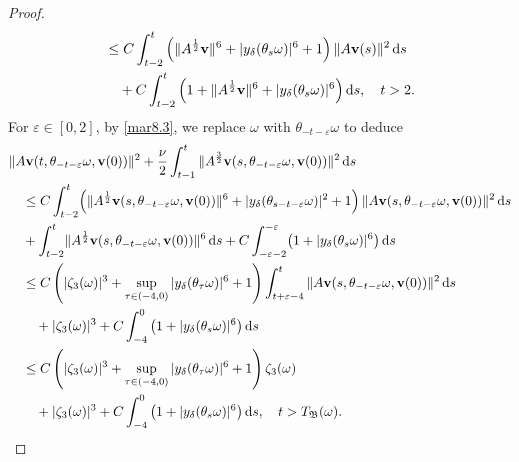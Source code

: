 \documentclass{elsarticle}
\theoremstyle{definition}
\numberwithin{equation}{section}
\renewcommand{\d}{{\rm{d}}}
\begin{document}
\begin{proof}
\begin{align*}
& \leq   C \int^t_{t-2} \left (\|A^{\frac{1}{2}}\textbf{v}\|^6+|y_\delta(\theta_s\omega)|^6+1\right)  \|A\textbf{v}(s) \|^2 \, \d s \\
&\quad + C\int^t_{t-2} \left (1+\|A^{\frac{1}{2}}\textbf{v}\|^6 +|y_\delta(\theta_s\omega)|^6 \right)  \d s ,\quad t> 2.
\end{align*}
For $\varepsilon\in  [0,2]$, by \eqref{mar8.3}, we replace $\omega$ with $\theta_{-t-\varepsilon} \omega$  to deduce
\begin{align*}
 & \|A\textbf{v} (t,\theta_{-t-\varepsilon} \omega, \textbf{v}(0)) \|^2 + \frac{ \nu}{2} \int_{t-1}^t  \|A^\frac32\textbf{v} (s,\theta_{-t-\varepsilon} \omega, \textbf{v}(0)) \|^2 \, \d s \nonumber \\
& \quad \leq   C \int^t_{t-2} \! \left (\|A^{\frac12}\textbf{v}(s,\theta_{-t-\varepsilon} \omega, \textbf{v}(0)) \|^6+|y_\delta(\theta_{s-t-\varepsilon} \omega)|^2+1\right)  \|A\textbf{v}(s,\theta_{-t-\varepsilon} \omega, \textbf{v}(0)) \|^2 \, \d s \nonumber\\
&\quad+\int^t_{t-2} \! \|A^{\frac12}\textbf{v}(s,\theta_{-t-\varepsilon} \omega, \textbf{v}(0)) \|^6\, \d s+ C\int^{-\varepsilon}_{-\varepsilon-2} \! \left(1 +|y_\delta(\theta_s\omega)|^6 \right )  \d s\nonumber\\
& \quad \leq   C\left (  |\zeta_3(\omega)|^3+ \sup_{\tau\in (-4,0)}|y_\delta(\theta_\tau\omega)|^6+1\right) \int^{t}_{t+\varepsilon-4}  \|A\textbf{v}(s,\theta_{-t-\varepsilon} \omega, \textbf{v}(0)) \|^2 \, \d s \nonumber\\
&\qquad+ |\zeta_3(\omega)|^3+ C\int^{0}_{-4}    \left(1 +|y_\delta(\theta_s\omega)|^6 \right)   \d s \nonumber\\
& \quad \leq   C\left (  |\zeta_3(\omega)|^3+ \sup_{\tau\in (-4,0)}|y_\delta(\theta_\tau\omega)|^6+1\right) \zeta_3(\omega) \nonumber\\
&\qquad+ |\zeta_3(\omega)|^3+ C\int^{0}_{-4}    \left(1 +|y_\delta(\theta_s\omega)|^6 \right)   \d s,\quad t>T_{\mathfrak B} (\omega) .
\end{align*}


\end{proof}
\end{document}
